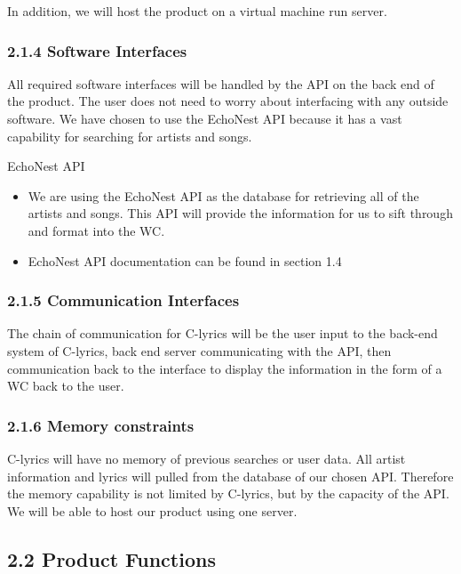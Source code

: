 \documentclass[]{article}
\begin{document}
In addition, we will host the product on a virtual machine run server.

\subsubsection{2.1.4 Software Interfaces}\label{software-interfaces}

All required software interfaces will be handled by the API on the back
end of the product. The user does not need to worry about interfacing
with any outside software. We have chosen to use the EchoNest API
because it has a vast capability for searching for artists and songs.

EchoNest API

\begin{itemize}
\itemsep1pt\parskip0pt
\item
  We are using the EchoNest API as the database for retrieving all of
  the artists and songs. This API will provide the information for us to
  sift through and format into the WC.
\item
  EchoNest API documentation can be found in section 1.4
\end{itemize}

\subsubsection{2.1.5 Communication
Interfaces}\label{communication-interfaces}

The chain of communication for C-lyrics will be the user input to the
back-end system of C-lyrics, back end server communicating with the API,
then communication back to the interface to display the information in
the form of a WC back to the user.

\subsubsection{2.1.6 Memory constraints}\label{memory-constraints}

C-lyrics will have no memory of previous searches or user data. All
artist information and lyrics will pulled from the database of our
chosen API. Therefore the memory capability is not limited by C-lyrics,
but by the capacity of the API. We will be able to host our product
using one server.

\subsection{2.2 Product Functions}\label{product-functions}
\end{document}
